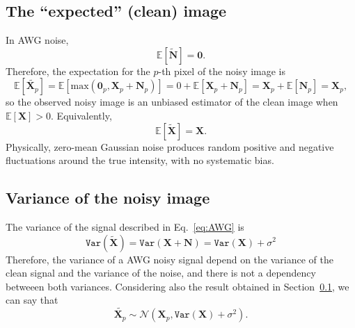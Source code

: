 \subsection{The ``expected'' (clean) image}
\label{sec:expected_noisy_AWG}
In \gls{AWG} noise, 
\begin{equation}
  \mathbb{E}[\tilde{\bm{N}}] = \bm{0}.
\end{equation}
Therefore, the expectation for the $p$-th pixel of the noisy image is
\begin{equation}
  \mathbb{E}[\tilde{\bm{X}_p}] = \mathbb{E}[\text{max}(\bm{0}_p, \bm{X}_p+\bm{N}_p)] = 0 + \mathbb{E}[\bm{X}_p+\bm{N}_p] = \bm{X}_p + \mathbb{E}[\bm{N}_p] = \bm{X}_p,
  \label{eq:E_AWG}
\end{equation}
so the observed noisy image is an unbiased estimator of the clean
image when $\mathbb{E}[\bm{X}]>0$. Equivalently,
\begin{equation}
  \mathbb{E}[\tilde{\bm{X}}] = \bm{X}.
\end{equation}
Physically, zero-mean Gaussian noise produces random positive and
negative fluctuations around the true intensity, with no systematic
bias.

\subsection{Variance of the noisy image}
\label{sec:variance_noisy_AWG}
The variance of the signal described in Eq.~\ref{eq:AWG} is
\begin{equation}
  \mathtt{Var}(\tilde{\bm{X}}) = \mathtt{Var}(\bm{X}+\bm{N}) = \mathtt{Var}(\bm{X}) + \sigma^2
  \label{eq:V_AWG}
\end{equation}
Therefore, the variance of a \gls{AWG} noisy signal depend on the
variance of the clean signal and the variance of the noise, and there
is not a dependency betweeen both variances. Considering also the
result obtained in Section~\ref{sec:expected_noisy_AWG}, we can say that
\begin{equation}
  \tilde{\bm{X}_p}\sim\mathcal{N}(\bm{X}_p,\mathtt{Var}(\bm{X}) + \sigma^2).
\end{equation}

